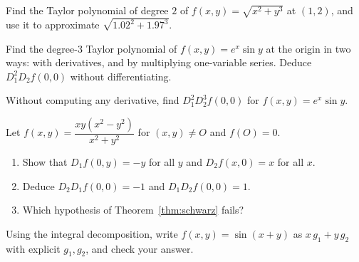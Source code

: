 \begin{exercise}[2]
Find the Taylor polynomial of degree $2$ of $f(x,y)=\sqrt{x^2+y^3}$ at $(1,2)$, and use it
to approximate $\sqrt{1.02^2+1.97^3}$.
\end{exercise}

\begin{exercise}[2]
Find the degree-3 Taylor polynomial of $f(x,y)=e^x\sin y$ at the origin in two ways: with
derivatives, and by multiplying one-variable series. Deduce $D_1^2D_2f(0,0)$ without
differentiating.
\end{exercise}

\begin{exercise}[2]
Without computing any derivative, find $D_1^2D_2^3f(0,0)$ for $f(x,y)=e^x\sin y$.
\end{exercise}

\begin{exercise}[3]\label{q:schwarz}
Let $f(x,y)=\dfrac{xy(x^2-y^2)}{x^2+y^2}$ for $(x,y)\neq O$ and $f(O)=0$.
\begin{enumerate}[label=(\alph*)]
  \item Show that $D_1f(0,y)=-y$ for all $y$ and $D_2f(x,0)=x$ for all $x$.
  \item Deduce $D_2D_1f(0,0)=-1$ and $D_1D_2f(0,0)=1$.
  \item Which hypothesis of Theorem~\ref{thm:schwarz} fails?
\end{enumerate}
\end{exercise}

\begin{exercise}[3]
Using the integral decomposition, write $f(x,y)=\sin(x+y)$ as $x\,g_1+y\,g_2$ with explicit
$g_1,g_2$, and check your answer.
\end{exercise}
